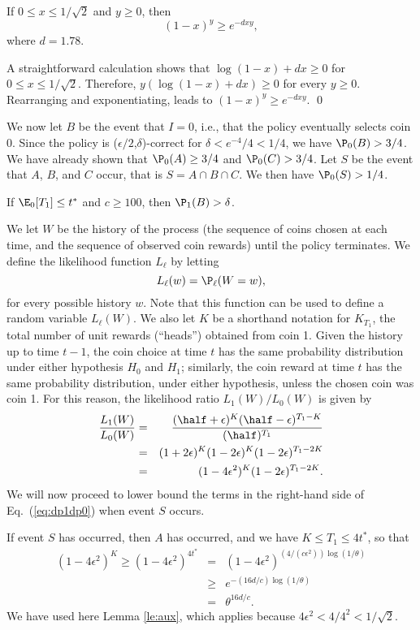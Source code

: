 \begin{lemma}
\label{le:aux}
If $0\leq x\leq 1/\sqrt{2} $ and
$y\ge 0$, then
$$
(1-x)^y \ge e^{-dxy},
$$
where $d=1.78$.
\end{lemma}
\proof A straightforward calculation shows that $\log (1-x) + dx
\ge 0 $ for $0\le x \le 1/\sqrt{2}$. Therefore, $y (\log (1-x) + dx) \ge
0$ for every $y\ge 0$. Rearranging and exponentiating, leads to
$(1-x)^y \ge e^{-dxy}$. \qed


We now let $B$ be the event that $I=0$, i.e., that the policy
eventually selects coin 0. Since the policy is
($\epsilon/2$,$\delta$)-correct for $\delta<e^{-4}/4< 1/4$, we have
$\P_0(B)> 3/4$. We have already shown that  $\P_0(A)\ge 3/4$ and
$\P_0(C)> 3/4$. Let $S$ be the event
that $A$, $B$, and $C$ occur, that is $S=A\cap B \cap C$. We then
have $\P_0 (S)> 1/4$.

\begin{lemma} If $\E_0[ T_1] \leq t^*$ and $c\ge 100$, then
$\P_1(B) > \delta$. \label{le:pspec}
\end{lemma}
\proof We let $W$ be the history of the process (the sequence of
coins chosen at each time, and the sequence of observed
coin rewards) until the policy terminates.
We define the likelihood function $L_\ell$ by letting
$$L_\ell(w)=\P_\ell(W=w),$$
for every possible history $w$. Note that this function can be
used to define a random variable $L_\ell(W)$.  We also let $K$ be a
shorthand notation for $K_{T_1}$, the total number of  unit
rewards (``heads'') obtained from coin 1.
Given the history up to time $t-1$, the coin choice at time $t$ has the same probability distribution
under either hypothesis $H_0$ and $H_1$; similarly, the coin reward at time $t$
has the same probability
distribution, under either hypothesis, unless the chosen coin was coin 1.
For this reason, the likelihood ratio $L_1(W)/L_0(W)$ is given by
\begin{eqnarray}
\frac{L_1(W)}{L_0(W)} & = &
\frac{(\half+\epsilon)^{K}(\half-\epsilon)^{T_1 - K}}{(\half) ^ {T_1}}
\nonumber\\ &= &(1+2 \epsilon)^{K} (1-2 \epsilon)^{K} (1-2 \epsilon)^{T_1 - 2K}
\nonumber\\ & = & (1 - 4 \epsilon ^2)^{K} (1-2 \epsilon)^{T_1 - 2K}.
\label{eq:dp1dp0}
\end{eqnarray}
We will now proceed to lower  bound the terms in the right-hand
side of Eq.~(\ref{eq:dp1dp0}) when event $S$ occurs.

If event $S$ has occurred, then $A$ has occurred, and we have $K
\le T_1 \le 4t^*$, so that
\begin{eqnarray*}
(1-4\epsilon^2)^K \ge (1-4 \epsilon ^2)^{4t^*} & = &
(1-4 \epsilon ^2)^{({4}/({c \epsilon ^2}))
\log(1/\theta)} \\
& \ge & e^{-({16d}/{c}) \log(1/\theta)} \\ & = &\theta ^{16d/c}.
\end{eqnarray*}
We have used here Lemma \ref{le:aux}, which applies because
$4\epsilon^2<4/4^2<1/\sqrt{2}$.

